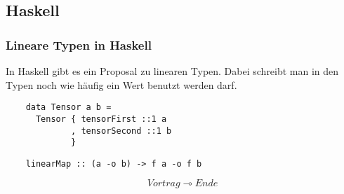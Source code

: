\documentclass{beamer}
\begin{document}
\subsection{Haskell}
\begin{frame}[fragile]
  \frametitle{Lineare Typen in Haskell}
  In Haskell gibt es ein Proposal zu linearen Typen. Dabei schreibt man in den Typen noch wie häufig ein Wert benutzt werden darf.

  \begin{lstlisting}
    data Tensor a b =
      Tensor { tensorFirst ::1 a
             , tensorSecond ::1 b
             }
  \end{lstlisting}

  \begin{lstlisting}
    linearMap :: (a -o b) -> f a -o f b
  \end{lstlisting}
\end{frame}

\begin{frame}
  \begin{equation*}
    Vortrag \multimap Ende
  \end{equation*}
\end{frame}
\end{document}

